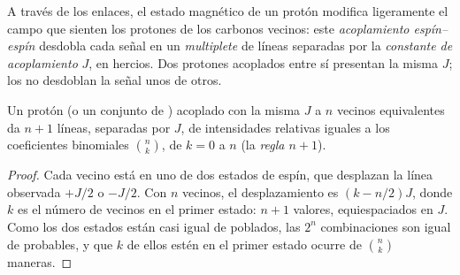 \begin{definition}\label{def:b1:structure-spectroscopy:coupling}
A través de los enlaces, el estado magnético de un protón modifica
ligeramente el campo que sienten los protones de los carbonos vecinos:
este \emph{acoplamiento espín--espín} desdobla
cada señal en un \emph{multiplete} de líneas separadas
por la \emph{constante de acoplamiento}
$J$, en hercios. Dos protones acoplados entre sí presentan la misma $J$;
los  no desdoblan la señal unos de otros.
\end{definition}

\begin{proposition}\label{prop:b1:structure-spectroscopy:n-plus-one}
Un protón (o un conjunto de ) acoplado con la misma
$J$ a $n$ vecinos equivalentes da $n + 1$ líneas, separadas por $J$, de
intensidades relativas iguales a los coeficientes binomiales
$\binom{n}{k}$, de $k = 0$ a $n$ (la \emph{regla $n + 1$}).
\end{proposition}

\begin{proof}
Cada vecino está en uno de dos estados de espín, que desplazan la línea
observada $+J/2$ o $-J/2$. Con $n$ vecinos, el desplazamiento es
$(k - n/2)J$, donde $k$ es el número de vecinos en el primer estado:
$n + 1$ valores, equiespaciados en $J$. Como los dos estados están casi
igual de poblados, las $2^n$ combinaciones son igual de probables, y que
$k$ de ellos estén en el primer estado ocurre de $\binom{n}{k}$ maneras.
\end{proof}

